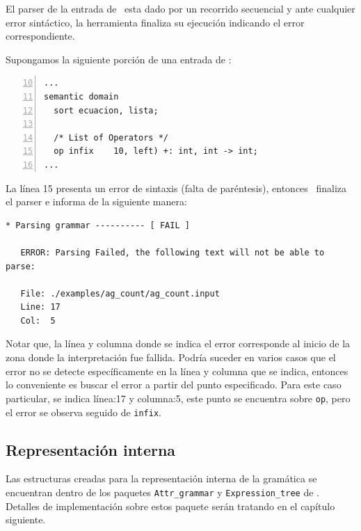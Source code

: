 El parser de la entrada de \maggen\ esta dado por un recorrido secuencial y ante cualquier error sintáctico, la herramienta finaliza su ejecución indicando el error correspondiente. 

Supongamos la siguiente porción de una entrada de \maggen:

\vspace{0.3cm}
\begin{lstlisting}[basicstyle=\footnotesize, numbers=left, firstnumber=10, numbers=left, language=specmag, linewidth=9cm, columns=fullflexible]
...
semantic domain
  sort ecuacion, lista;

  /* List of Operators */
  op infix    10, left) +: int, int -> int;
...
\end{lstlisting}
\vspace{0.3cm}

La línea 15 presenta un error de sintaxis (falta de paréntesis), entonces \maggen\ finaliza el parser e informa de la siguiente manera:

\vspace{0.3cm}
\begin{lstlisting}[backgroundcolor=\color{white}, basicstyle=\footnotesize]
   * Parsing grammar ---------- [ FAIL ]

   ERROR: Parsing Failed, the following text will not be able to parse:

   File: ./examples/ag_count/ag_count.input
   Line: 17
   Col:  5
\end{lstlisting}
\vspace{0.3cm}

Notar que, la línea y columna donde se indica el error corresponde al inicio de la zona donde la interpretación fue fallida. Podría suceder en varios casos que el error no se detecte específicamente en la línea y columna que se indica, entonces lo conveniente es buscar el error a partir del punto especificado. Para este caso particular, se indica línea:17 y columna:5, este punto se encuentra sobre \texttt{op}, pero el error se observa seguido de \texttt{infix}.

\subsection*{Representación interna}

Las estructuras creadas para la representación interna de la gramática se encuentran dentro de los paquetes \texttt{Attr\_grammar} y \texttt{Expression\_tree} de \maggen. Detalles de implementación sobre estos paquete serán tratando en el capítulo siguiente. 

